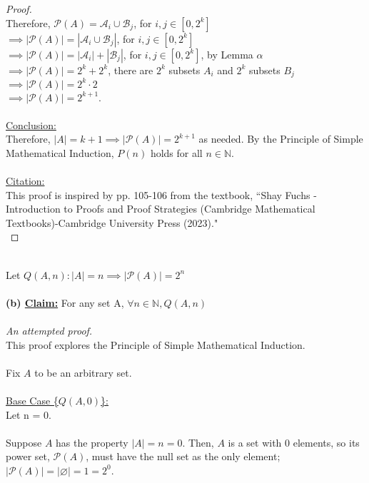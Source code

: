 \documentclass[12pt]{article}
\begin{document}
\begin{proof}
    \\
    Therefore, $\mathcal{P}(A) = \mathcal{A}_i \cup \mathcal{B}_j$, for $i, j \in [0, 2^k]$ \\
    $\implies |\mathcal{P}(A)| = |\mathcal{A}_i \cup \mathcal{B}_j|$, for $i, j \in [0, 2^k]$ \\
    $\implies |\mathcal{P}(A)| = |\mathcal{A}_i| + |\mathcal{B}_j|$, for $i, j \in [0, 2^k]$, by Lemma $\alpha$ \\
    $\implies |\mathcal{P}(A)| = 2^k + 2^k$, there are $2^k$ subsets $A_i$ and $2^k$ subsets $B_j$ \\
    $\implies |\mathcal{P}(A)| = 2^k \cdot 2$ \\
    $\implies |\mathcal{P}(A)| = 2^{k+1}$. \\
    \\
    \underline{Conclusion:} \\
    Therefore, $|A| = k + 1 \implies |\mathcal{P}(A)| = 2^{k+1}$ as needed. By the Principle of Simple Mathematical Induction, $P(n)$ holds for all $n \in \mathbb{N}$. \\
    \\
    \underline{Citation:} \\
    This proof is inspired by pp. 105-106 from the textbook, ``Shay Fuchs - Introduction to Proofs and Proof Strategies (Cambridge Mathematical Textbooks)-Cambridge University Press (2023)." \\
\end{proof}
\leavevmode\\
Let $Q(A, n): |A| = n \implies |\mathcal{P}(A)| = 2^n$ \\
\\
\textbf{(b) \underline{Claim:}} For any set A, $\forall n \in \mathbb{N}, Q(A, n)$ \\
\\
\textit{An attempted proof.} \\
This proof explores the Principle of Simple Mathematical Induction. \\
\\
Fix $A$ to be an arbitrary set. \\
\\
\underline{Base Case \{$Q(A, 0)$\}:} \\
Let n = 0. \\
\\
Suppose $A$ has the property $|A| = n = 0$. Then, $A$ is a set with $0$ elements, so its power set, $\mathcal{P}(A)$, must have the null set as the only element; $|\mathcal{P}(A)| = |\varnothing| = 1 = 2^0$. \\
\end{document}
